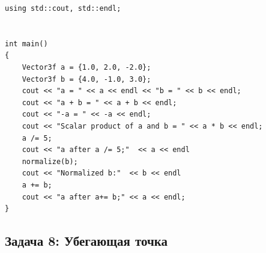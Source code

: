 \documentclass{article}
\begin{document}
\begin{itemize}
\begin{lstlisting}
using std::cout, std::endl;


int main() 
{
	Vector3f a = {1.0, 2.0, -2.0};
	Vector3f b = {4.0, -1.0, 3.0};
	cout << "a = " << a << endl << "b = " << b << endl;
	cout << "a + b = " << a + b << endl;
	cout << "-a = " << -a << endl;
	cout << "Scalar product of a and b = " << a * b << endl;
	a /= 5;
	cout << "a after a /= 5;"  << a << endl
	normalize(b);
	cout << "Normalized b:"  << b << endl
	a += b;
	cout << "a after a+= b;" << a << endl;
}
\end{lstlisting}

\end{itemize}

\newpage
\subsection*{Задача 8: Убегающая точка}
\end{document}

